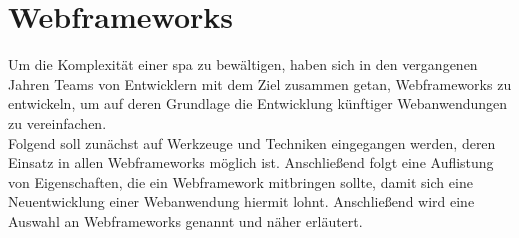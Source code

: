\chapter{Webframeworks}
\label{sec:webframeworks}
Um die Komplexität einer \ac{spa} zu bewältigen, haben sich in den vergangenen Jahren Teams von Entwicklern mit dem Ziel zusammen getan, Webframeworks zu entwickeln, um auf deren Grundlage die Entwicklung künftiger Webanwendungen zu vereinfachen. \\
Folgend soll zunächst auf Werkzeuge und Techniken eingegangen werden, deren Einsatz in allen Webframeworks möglich ist. Anschließend folgt eine Auflistung von Eigenschaften, die ein Webframework mitbringen sollte, damit sich eine Neuentwicklung einer Webanwendung hiermit lohnt. Anschließend wird eine Auswahl an Webframeworks genannt und näher erläutert.




